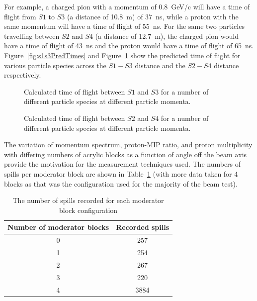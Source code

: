 For example, a charged pion with a momentum of 0.8~GeV/c will have a time of flight from $\mathit{S1}$ to $\mathit{S3}$ (a distance of 10.8~m) of 37~ns, while a proton with the same momentum will have a time of flight of 55~ns.
For the same two particles travelling between $\mathit{S2}$ and $\mathit{S4}$ (a distance of 12.7~m), the charged pion would have a time of flight of 43~ns and the proton would have a time of flight of 65~ns.
Figure~\ref{fig:s1s3PredTimes} and Figure~\ref{fig:s2s4PredTimes} show the predicted time of flight for various particle species across the $\mathit{S1}-\mathit{S3}$ distance and the $\mathit{S2}-\mathit{S4}$ distance respectively.

\begin{figure}[ht]
  \begin{minipage}[t]{0.49\textwidth}
    \begin{adjustbox}{max totalsize={\textwidth}{.5\textheight},center}
      
    \end{adjustbox}
    \caption{Calculated time of flight between $\mathit{S1}$ and $\mathit{S3}$ for a number of different particle species at different particle momenta.}
    \label{fig:s1s3PredTimes}
  \end{minipage}
  \hfill
  \begin{minipage}[t]{0.49\textwidth}
    \begin{adjustbox}{max totalsize={\textwidth}{.5\textheight},center}
      
    \end{adjustbox}
    \caption{Calculated time of flight between $\mathit{S2}$ and $\mathit{S4}$ for a number of different particle species at different particle momenta.}
    \label{fig:s2s4PredTimes}
  \end{minipage}
\end{figure}

The variation of momentum spectrum, proton-MIP ratio, and proton multiplicity with differing numbers of acrylic blocks as a function of angle off the beam axis provide the motivation for the measurement techniques used.
The numbers of spills per moderator block are shown in Table~\ref{tab:spills} (with more data taken for 4 blocks as that was the configuration used for the majority of the beam test).

\begin{table}
  \centering
  \begin{tabular}{|c|c|}
    \hline
    Number of moderator blocks & Recorded spills \\
    \hline
    0 & 257 \\
    1 & 254 \\
    2 & 267 \\
    3 & 220 \\
    4 & 3884 \\
    \hline
  \end{tabular}
  \caption{The number of spills recorded for each moderator block configuration}
  \label{tab:spills}
\end{table}

